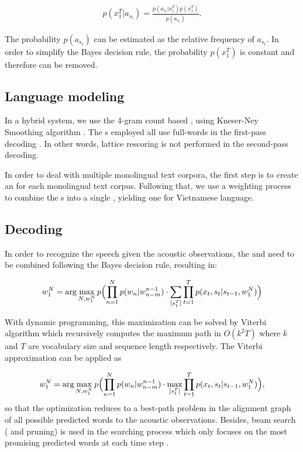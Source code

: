 \begin{align}
	p(x_1^T|a_{s_t}) = \frac{p(a_{s_t}|x_1^T)p(x_1^T)}{p(a_{s_t})}.
\end{align}

The probability $p(a_{s_t})$ can be estimated as the relative frequency of $a_{s_t}$.
In order to simplify the Bayes decision rule, the probability $p(x_1^T)$ is constant and therefore can be removed.
    
    
\subsection{Language modeling}

In a hybrid system, we use the 4-gram count based , using Kneser-Ney Smoothing algorithm \cite{kneser_ney_lm}. 
The s employed all use full-words in the first-pass decoding \cite{beck2019lstm}. 
In other words, lattice rescoring is not performed in the second-pass decoding.

In order to deal with multiple monolingual text corpora, the first step is to create an  for each monolingual text corpus. 
Following that, we use a weighting process to combine the s into a single , yielding one  for Vietnamese language.


\subsection{Decoding}

In order to recognize the speech given the acoustic observations, the  and  need to be combined following the Bayes decision rule, resulting in:

\begin{align}
	w_1^N = \operatorname{arg}\max_{N,w_1^N}p\Bigl(\prod_{n=1}^Np(w_n|w_{n-m}^{n-1}) \cdot
	\sum_{[s_1^T]}\prod_{t=1}^Tp(x_t,s_t|
	s_{t-1}, w_1^N)\Bigr)
\end{align}

With dynamic programming, this maximization can be solved by Viterbi algorithm which recursively computes the maximum path in $O(k^{2}T)$ where $k$ and $T$ are vocabulary size and sequence length respectively.
The Viterbi approximation can be applied as

\begin{align}
	w_1^N = \operatorname{arg}\max_{N,w_1^N}p\Bigl(\prod_{n=1}^Np(w_n|w_{n-m}^{n-1}) \cdot
	\max_{[s_1^T]}\prod_{t=1}^Tp(x_t,s_t|s_{t-1}, w_1^N)\Bigr),
\end{align}
so that the optimization reduces to a best-path problem in the alignment graph of all possible predicted words to the acoustic observations.
Besides, beam search ( and  pruning) is used in the searching process which only focuses on the most promising predicted words at each time step \cite{ortmanns1997word}.

